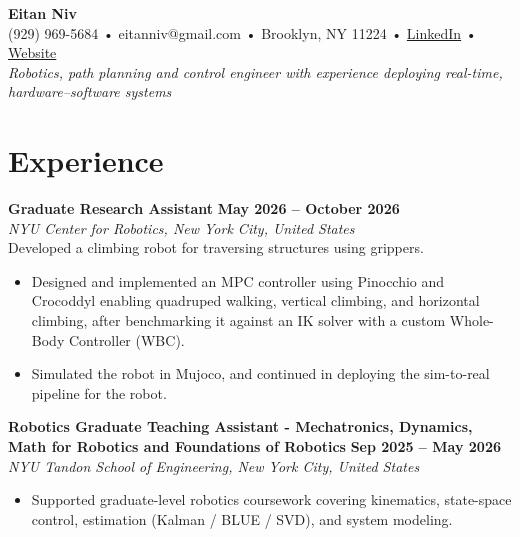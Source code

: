 \documentclass[10pt,letterpaper]{article}
\begin{document}
\begin{center}
    {\LARGE \textbf{Eitan Niv}} \\[4pt]
    (929) 969-5684 • eitanniv@gmail.com • Brooklyn, NY 11224 • \href{https://www.linkedin.com/in/eitan-niv-527904203/}{LinkedIn} • \href{https://lorkol.github.io/}{Website} \\[4pt]
    \textit{Robotics, path planning and control engineer with experience deploying real-time, hardware–software systems}
\end{center}

\vspace{-4pt}



\section{Experience}

\textbf{Graduate Research Assistant} \hfill \textbf{May 2026 – October 2026} \\
\textit{NYU Center for Robotics, New York City, United States} \\
Developed a climbing robot for traversing structures using grippers.
\begin{itemize}[nosep, leftmargin=1.5em, topsep=2pt]
    \item Designed and implemented an MPC controller using Pinocchio and Crocoddyl enabling quadruped walking, vertical climbing, and horizontal climbing, after benchmarking it against an IK solver with a custom Whole-Body Controller (WBC).
    \item Simulated the robot in Mujoco, and continued in deploying the sim-to-real pipeline for the robot.
\end{itemize}

\vspace{3pt}
\textbf{Robotics Graduate Teaching Assistant - Mechatronics, Dynamics, Math for Robotics and Foundations of Robotics} \hfill \textbf{Sep 2025 – May 2026} \\
\textit{NYU Tandon School of Engineering, New York City, United States}
\begin{itemize}[nosep, leftmargin=1.5em, topsep=2pt]
    \item Supported graduate-level robotics coursework covering kinematics, state-space control, estimation (Kalman / BLUE / SVD), and system modeling.
\end{itemize}
\end{document}
